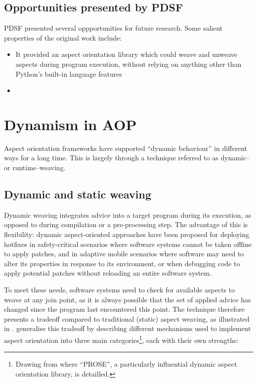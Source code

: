 \subsection{Opportunities presented by PDSF}

PDSF presented several oppportunities for future research. Some salient
properties of the original work include:

\begin{itemize}
    \item It provided an aspect orientation library which could weave and
    unweave aspects during program execution, without relying on anything other
    than Python's built-in language features
    \item {}
\end{itemize}


\section{Dynamism in AOP}

Aspect orientation frameworks have supported ``dynamic behaviour'' in different
ways for a long time. This is largely through a technique referred to as dynamic–
or runtime–weaving.

\subsection{Dynamic and static weaving}

Dynamic weaving integrates advice into a target program during its execution, as
opposed to during compilation or a pre-processing step. The advantage of this is
flexibility: dynamic aspect-oriented approaches have been proposed for deploying
hotfixes in safety-critical scenarios where software systems cannot be taken
offline to apply patches, and in adaptive mobile scenarios where software
may need to alter its properties in response to its
environment\cite{hveding2005aspect}, or when debugging code to apply potential
patches without reloading an entire software system\cite{popovici2002PROSE}.

To meet these needs, software systems need to check for available aspects to
weave at any join point, as it is always possible that the set of applied advice
has changed since the program last encountered this point. The technique
therefore presents a tradeoff compared to traditional (static) aspect weaving,
as illustrated in \cite{dynamicAOchitchyan}. \citeauthor{dynamicAOchitchyan}
generalise this tradeoff by describing different mechanisms used to implement
aspect orientation into three main categories\footnote{Drawing from
\cite{popovici2002PROSE,popovici2003JITaspects} where ``PROSE'', a particularly
influential dynamic aspect orientation library, is detailled.}, each with their own
strengths:

